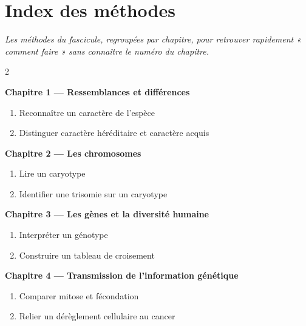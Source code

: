 \chapter{Index des méthodes}

\noindent\textit{Les méthodes du fascicule, regroupées par chapitre, pour retrouver
rapidement « comment faire » sans connaître le numéro du chapitre.}
\vspace{8pt}

\begin{multicols}{2}
\footnotesize

\textbf{\normalsize\color{onbo}Chapitre 1 --- Ressemblances et différences}
\begin{enumerate}[label=\arabic*.,itemsep=1pt,topsep=2pt,leftmargin=1.6em]
\item Reconnaître un caractère de l'espèce
\item Distinguer caractère héréditaire et caractère acquis
\end{enumerate}
\vspace{4pt}

\textbf{\normalsize\color{onbo}Chapitre 2 --- Les chromosomes}
\begin{enumerate}[label=\arabic*.,itemsep=1pt,topsep=2pt,leftmargin=1.6em]
\item Lire un caryotype
\item Identifier une trisomie sur un caryotype
\end{enumerate}
\vspace{4pt}

\textbf{\normalsize\color{onbo}Chapitre 3 --- Les gènes et la diversité humaine}
\begin{enumerate}[label=\arabic*.,itemsep=1pt,topsep=2pt,leftmargin=1.6em]
\item Interpréter un génotype
\item Construire un tableau de croisement
\end{enumerate}
\vspace{4pt}

\textbf{\normalsize\color{onbo}Chapitre 4 --- Transmission de l'information génétique}
\begin{enumerate}[label=\arabic*.,itemsep=1pt,topsep=2pt,leftmargin=1.6em]
\item Comparer mitose et fécondation
\item Relier un dérèglement cellulaire au cancer
\end{enumerate}
\vspace{4pt}


\end{multicols}
